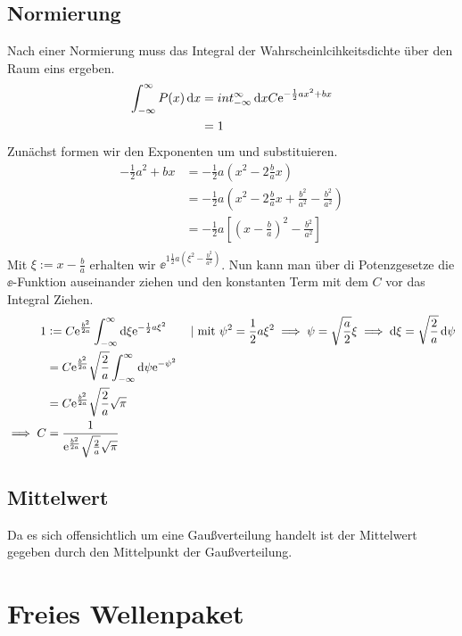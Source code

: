 \subsection{Normierung}
Nach einer Normierung muss das Integral der Wahrscheinlcihkeitsdichte über den Raum eins ergeben.
\begin{align*}
    \int^\infty_{-\infty} P(x)\dif x &= int^\infty_{-\infty}\dif xC\ee^{-\frac 12ax^2+bx} \\
                                     &= 1 \\
\end{align*}
Zunächst formen wir den Exponenten um und substituieren.
\begin{align*}
    -\frac 12a^2+bx &= -\frac 12a(x^2-2\frac bax) \\
                    &= -\frac 12a(x^2-2\frac bax+\frac{b^2}{a^2}-\frac{b^2}{a^2}) \\
                    &= -\frac 12a[(x-\frac ba)^2-\frac{b^2}{a^2}] \\
\end{align*}
Mit $\xi := x-\frac ba$ erhalten wir $\ee^{1\frac 12 a(\xi^2-\frac{b^2}{a^2})}$.
Nun kann man über di Potenzgesetze die $\ee$-Funktion auseinander ziehen und den konstanten Term mit dem $C$ vor das Integral Ziehen.
\begin{align*}
    1&:= C\ee^{\frac{b^2}{2a}}\int^\infty_{-\infty}\dif\xi\ee^{-\frac 12a\xi^2} \qquad|\text{ mit }\psi^2 = \frac 12a\xi^2 \implies \psi=\sqrt{\frac a2}\xi \implies \dif\xi=\sqrt{\frac 2a}\dif \psi\\ 
     &= C\ee^{\frac{b^2}{2a}}\sqrt{\frac 2a}\int^\infty_{-\infty}\dif\psi\ee^{-\psi^2} \\
     &= C\ee^{\frac{b^2}{2a}}\sqrt{\frac 2a}\sqrt{\pi} \\
     \implies C &= \frac{1}{\ee^{\frac{b^2}{2a}}\sqrt{\frac 2a}\sqrt{\pi}} \\
\end{align*}

\subsection{Mittelwert}
Da es sich offensichtlich um eine Gaußverteilung handelt ist der Mittelwert gegeben durch den Mittelpunkt der Gaußverteilung.

\section{Freies Wellenpaket}

